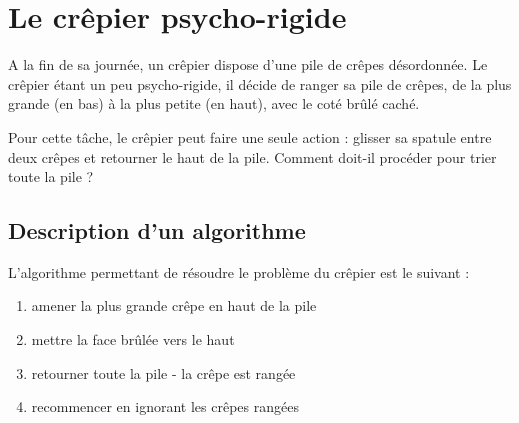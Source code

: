 \documentclass[a5paper,pagesize,DIV=14]{scrbook}
\begin{document}
\chapter*{Le crêpier psycho-rigide}

A la fin de sa journée, un crêpier dispose d'une pile de crêpes désordonnée. Le crêpier étant un peu psycho-rigide, il décide de ranger sa pile de crêpes, de la plus grande (en bas) à la plus petite (en haut), avec le coté brûlé caché. 

\begin{center}
  
\end{center}

Pour cette tâche, le crêpier peut faire une seule action : glisser sa spatule entre deux crêpes et retourner le haut de la pile. Comment doit-il procéder pour trier toute la pile ?

\begin{center}
  
\end{center}



\newpage

\section*{Description d'un algorithme}

L'algorithme permettant de résoudre le problème du crêpier est le suivant :

\begin{enumerate}
\item amener la plus grande crêpe en haut de la pile
\item mettre la face brûlée vers le haut
\item retourner toute la pile - la crêpe est rangée
\item recommencer en ignorant les crêpes rangées
\end{enumerate}
\end{document}
